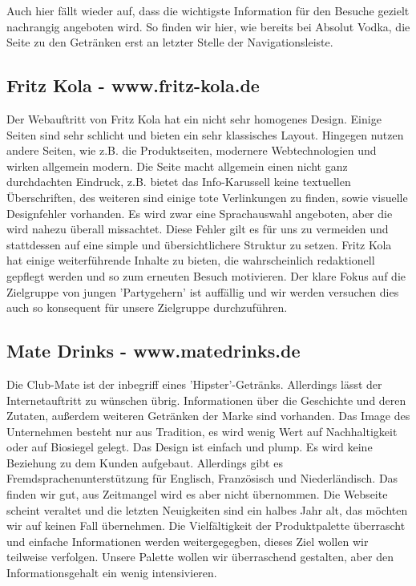 \documentclass[12pt,a4paper,oneside,ngerman]{article}
\begin{document}
Auch hier fällt wieder auf, dass die wichtigste Information für den Besuche gezielt nachrangig angeboten wird. So finden wir hier, wie bereits bei Absolut Vodka, die Seite zu den Getränken erst an letzter Stelle der Navigationsleiste.

\subsection{Fritz Kola - www.fritz-kola.de} %
Der Webauftritt von Fritz Kola hat ein nicht sehr homogenes Design. Einige Seiten sind sehr schlicht und bieten ein sehr klassisches Layout. 
Hingegen nutzen andere Seiten, wie z.B. die Produktseiten, modernere Webtechnologien und wirken allgemein modern.
Die Seite macht allgemein einen nicht ganz durchdachten Eindruck, z.B. bietet das Info-Karussell keine textuellen Überschriften, des weiteren sind einige tote Verlinkungen zu finden, sowie visuelle Designfehler vorhanden.
Es wird zwar eine Sprachauswahl angeboten, aber die wird nahezu überall missachtet.
Diese Fehler gilt es für uns zu vermeiden und stattdessen auf eine simple und übersichtlichere Struktur zu setzen.
Fritz Kola hat einige weiterführende Inhalte zu bieten, die wahrscheinlich redaktionell gepflegt werden und so zum erneuten Besuch motivieren.
Der klare Fokus auf die Zielgruppe von jungen 'Partygehern' ist auffällig und wir werden versuchen dies auch so konsequent für unsere Zielgruppe durchzuführen.

\subsection{Mate Drinks - www.matedrinks.de} %
Die Club-Mate ist der inbegriff eines 'Hipster'-Getränks. Allerdings lässt der Internetauftritt zu wünschen übrig. Informationen über die Geschichte und deren Zutaten, außerdem weiteren Getränken der Marke sind vorhanden. Das Image des Unternehmen besteht nur aus Tradition, es wird wenig Wert auf Nachhaltigkeit oder auf Biosiegel gelegt. Das Design ist einfach und plump. Es wird keine Beziehung zu dem Kunden aufgebaut. Allerdings gibt es Fremdsprachenunterstützung für Englisch, Französisch und Niederländisch. Das finden wir gut, aus Zeitmangel wird es aber nicht übernommen. Die Webseite scheint veraltet und die letzten Neuigkeiten sind ein halbes Jahr alt, das möchten wir auf keinen Fall übernehmen. Die Vielfältigkeit der Produktpalette überrascht und einfache Informationen werden weitergegegben, dieses Ziel wollen wir teilweise verfolgen. Unsere Palette wollen wir überraschend gestalten, aber den Informationsgehalt ein wenig intensivieren.
\end{document}
